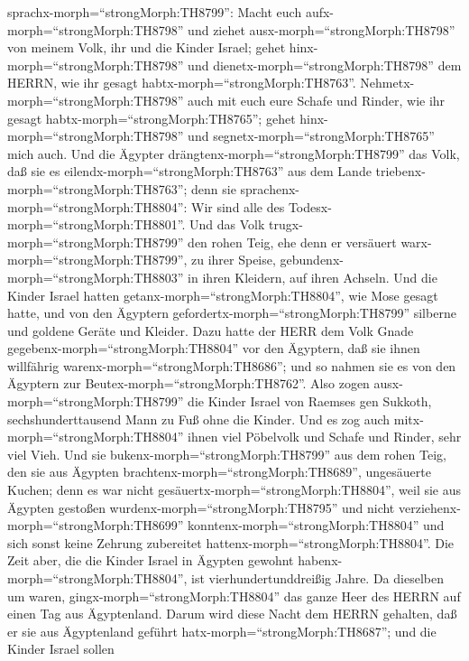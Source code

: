 sprachx-morph=``strongMorph:TH8799'': Macht euch
aufx-morph=``strongMorph:TH8798'' und ziehet
ausx-morph=``strongMorph:TH8798'' von meinem Volk, ihr und die Kinder
Israel; gehet hinx-morph=``strongMorph:TH8798'' und
dienetx-morph=``strongMorph:TH8798'' dem HERRN, wie ihr gesagt
habtx-morph=``strongMorph:TH8763''. 
Nehmetx-morph=``strongMorph:TH8798'' auch mit euch eure Schafe und
Rinder, wie ihr gesagt habtx-morph=``strongMorph:TH8765''; gehet
hinx-morph=``strongMorph:TH8798'' und
segnetx-morph=``strongMorph:TH8765'' mich auch.  Und die
Ägypter drängtenx-morph=``strongMorph:TH8799'' das Volk, daß sie es
eilendx-morph=``strongMorph:TH8763'' aus dem Lande
triebenx-morph=``strongMorph:TH8763''; denn sie
sprachenx-morph=``strongMorph:TH8804'': Wir sind alle des
Todesx-morph=``strongMorph:TH8801''.  Und das Volk
trugx-morph=``strongMorph:TH8799'' den rohen Teig, ehe denn er versäuert
warx-morph=``strongMorph:TH8799'', zu ihrer Speise,
gebundenx-morph=``strongMorph:TH8803'' in ihren Kleidern, auf ihren
Achseln.  Und die Kinder Israel hatten
getanx-morph=``strongMorph:TH8804'', wie Mose gesagt hatte, und von den
Ägyptern gefordertx-morph=``strongMorph:TH8799'' silberne und goldene
Geräte und Kleider.  Dazu hatte der HERR dem Volk Gnade
gegebenx-morph=``strongMorph:TH8804'' vor den Ägyptern, daß sie ihnen
willfährig warenx-morph=``strongMorph:TH8686''; und so nahmen sie es von
den Ägyptern zur Beutex-morph=``strongMorph:TH8762''.  Also
zogen ausx-morph=``strongMorph:TH8799'' die Kinder Israel von Raemses
gen Sukkoth, sechshunderttausend Mann zu Fuß ohne die Kinder.
 Und es zog auch mitx-morph=``strongMorph:TH8804'' ihnen
viel Pöbelvolk und Schafe und Rinder, sehr viel Vieh.  Und
sie bukenx-morph=``strongMorph:TH8799'' aus dem rohen Teig, den sie aus
Ägypten brachtenx-morph=``strongMorph:TH8689'', ungesäuerte Kuchen; denn
es war nicht gesäuertx-morph=``strongMorph:TH8804'', weil sie aus
Ägypten gestoßen wurdenx-morph=``strongMorph:TH8795'' und nicht
verziehenx-morph=``strongMorph:TH8699''
konntenx-morph=``strongMorph:TH8804'' und sich sonst keine Zehrung
zubereitet hattenx-morph=``strongMorph:TH8804''.  Die Zeit
aber, die die Kinder Israel in Ägypten gewohnt
habenx-morph=``strongMorph:TH8804'', ist vierhundertunddreißig Jahre.
 Da dieselben um waren, gingx-morph=``strongMorph:TH8804''
das ganze Heer des HERRN auf einen Tag aus Ägyptenland. 
Darum wird diese Nacht dem HERRN gehalten, daß er sie aus Ägyptenland
geführt hatx-morph=``strongMorph:TH8687''; und die Kinder Israel sollen
